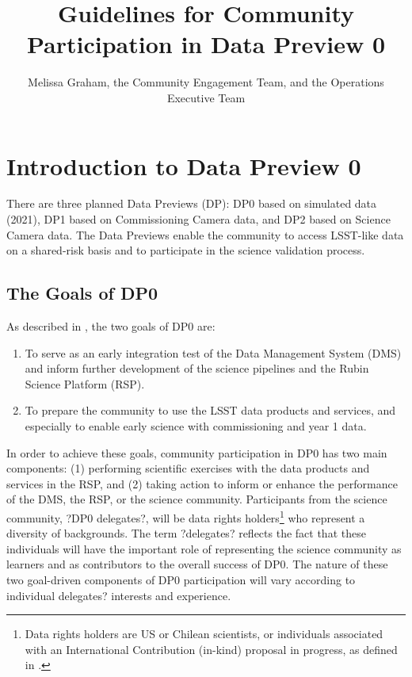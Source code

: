 \documentclass[DM,authoryear,toc]{lsstdoc}
\title{Guidelines for Community Participation in Data Preview 0}
\author{Melissa Graham, the Community Engagement Team, and the Operations Executive Team}
\date{\vcsDate}
\begin{document}
\maketitle

\renewcommand{\thepage}{\arabic{page}}%

\setcounter{page}{1}%


\section{Introduction to Data Preview 0}\label{sec:intro}

There are three planned Data Previews (DP): DP0 based on simulated data (2021), DP1 based on Commissioning Camera data, and DP2 based on Science Camera data.
The Data Previews enable the community to access LSST-like data on a shared-risk basis and to participate in the science validation process. 

\subsection{The Goals of DP0}\label{ssec:intro_goals}

As described in \citet{RTN-001}, the two goals of DP0 are:
\begin{enumerate}
\item To serve as an early integration test of the Data Management System (DMS) and inform further development of the science pipelines and the Rubin Science Platform (RSP).
\item To prepare the community to use the LSST data products and services, and especially to enable early science with commissioning and year 1 data.
\end{enumerate}

In order to achieve these goals, community participation in DP0 has two main components:
(1) performing scientific exercises with the data products and services in the RSP, and
(2) taking action to inform or enhance the performance of the DMS, the RSP, or the science community.
Participants from the science community, ?DP0 delegates?, will be data rights holders\footnote{Data rights holders are US or Chilean scientists, or individuals associated with an International Contribution (in-kind) proposal in progress, as defined in \citet{RDO-013}.} who represent a diversity of backgrounds.
The term ?delegates? reflects the fact that these individuals will have the important role of representing the science community as learners and as contributors to the overall success of DP0.
The nature of these two goal-driven components of DP0 participation will vary according to individual delegates? interests and experience.
\end{document}
